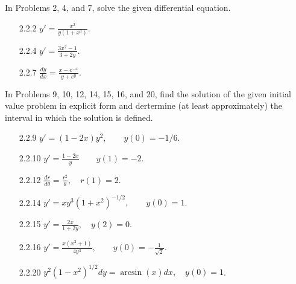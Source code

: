 In Problems 2, 4, and 7, solve the given differential equation.
\begin{enumerate}
   \item[2.2.2]   $y' = \frac{x^2}{y(1 + x^3)}$.
   \item[2.2.4]   $y' = \frac{3x^2 - 1}{3 + 2y}$.
   \item[2.2.7]   $\frac{dy}{dx} = \frac{x - e^{-x}}{y + e^y}$.      
\end{enumerate}

In Problems 9, 10, 12, 14, 15, 16, and 20, find the solution of the given
initial value problem in explicit form and dertermine (at least approximately)
the interval in which the solution is defined.
\begin{enumerate}
   \item[2.2.9]   $y' = (1 - 2x)y^2, \qquad y(0) = -1/6$.      
   \item[2.2.10]  $y' = \frac{1-2x}{y} \qquad y(1) = -2$.
   \item[2.2.12]  $\frac{dr}{d\theta} = \frac{r^2}{\theta}, \quad r(1) = 2$.
   \item[2.2.14]  $y' = xy^3(1+x^2)^{-1/2}, \qquad y(0) = 1$.
   \item[2.2.15]  $y' = \frac{2x}{1+2y}, \quad y(2) = 0$.
   \item[2.2.16]  $y' = \frac{x(x^2 + 1)}{4y^3}, \qquad
                        y(0) = -\frac{1}{\sqrt{2}}$.
   \item[2.2.20]  $y^2(1-x^2)^{1/2}dy = \arcsin(x)dx, \quad y(0) = 1$.
\end{enumerate}
